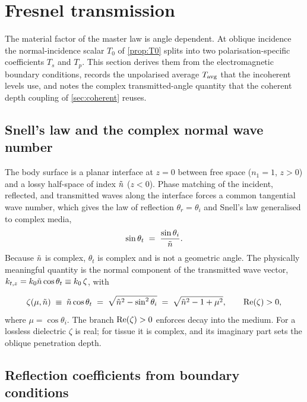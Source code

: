 \section{Fresnel transmission}\label{sec:fresnel}

The material factor of the master law is angle dependent. At oblique incidence
the normal-incidence scalar $T_0$ of \cref{prop:T0} splits into two
polarisation-specific coefficients $T_s$ and $T_p$. This section derives them
from the electromagnetic boundary conditions, records the unpolarised average
$T_{\mathrm{avg}}$ that the incoherent levels use, and notes the complex transmitted-angle
quantity that the coherent depth coupling of \cref{sec:coherent} reuses.

\subsection{Snell's law and the complex normal wave number}\label{sec:snell}

The body surface is a planar interface at $z=0$ between free space ($n_1=1$,
$z>0$) and a lossy half-space of index $\tilde{n}$ ($z<0$). Phase matching of the
incident, reflected, and transmitted waves along the interface forces a common
tangential wave number, which gives the law of reflection $\theta_r=\theta_i$
and Snell's law generalised to complex media,
\begin{equation}\label{eq:snell}
  \sin\theta_t \;=\; \frac{\sin\theta_i}{\tilde{n}}.
\end{equation}
Because $\tilde{n}$ is complex, $\theta_t$ is complex and is not a geometric
angle. The physically meaningful quantity is the normal component of the
transmitted wave vector, $k_{t,z}=k_0\tilde{n}\cos\theta_t \equiv k_0\,\zeta$, with

\begin{definition}\label{def:zeta}
\begin{equation}\label{eq:zeta-def}
  \zeta(\mu,\tilde{n}) \;\equiv\; \tilde{n}\cos\theta_t
  \;=\; \sqrt{\tilde{n}^2 - \sin^2\theta_i}
  \;=\; \sqrt{\tilde{n}^2 - 1 + \mu^2},
  \qquad \operatorname{Re}(\zeta)>0,
\end{equation}
where $\mu=\cos\theta_i$. The branch $\operatorname{Re}(\zeta)>0$ enforces decay into the
medium. For a lossless dielectric $\zeta$ is real; for tissue it is complex, and
its imaginary part sets the oblique penetration depth.
\end{definition}

\subsection{Reflection coefficients from boundary conditions}\label{sec:rs-rp}

